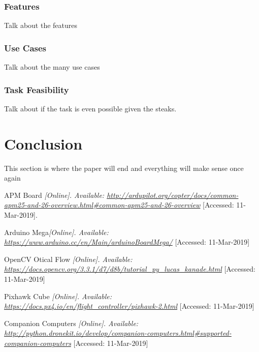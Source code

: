 \documentclass[conference,12pt, ]{IEEEtran}
\begin{document}
\subsubsection{Features}
Talk about the features
\subsubsection{Use Cases}
Talk about the many use cases
\subsubsection{Task Feasibility}
Talk about if the task is even possible given the steaks.



\section{Conclusion}
This section is where the paper will end and everything will make sense once again

  \begin{thebibliography}{999}

    APM Board  {\em [Online]. Available: \url{http://ardupilot.org/copter/docs/common-apm25-and-26-overview.html#common-apm25-and-26-overview}} [Accessed: 11-Mar-2019].

   Arduino Mega{\em [Online]. Available: \url{https://www.arduino.cc/en/Main/arduinoBoardMega/}} [Accessed: 11-Mar-2019]

   OpenCV Otical Flow {\em [Online]. Available: \url{https://docs.opencv.org/3.3.1/d7/d8b/tutorial_py_lucas_kanade.html}} [Accessed: 11-Mar-2019]

 Pixhawk Cube {\em [Online]. Available: \url{https://docs.px4.io/en/flight_controller/pixhawk-2.html}} [Accessed: 11-Mar-2019]

 Companion Computers {\em [Online]. Available: \url{http://python.dronekit.io/develop/companion-computers.html#supported-companion-computers}} [Accessed: 11-Mar-2019]

  \end{thebibliography}
\end{document}
